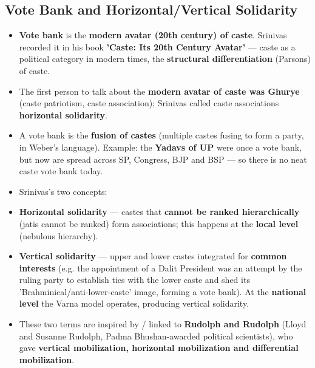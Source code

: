 \subsection{Vote Bank and Horizontal/Vertical Solidarity}

\begin{KeyConcept}
\begin{itemize}
\item \textbf{Vote bank} is the \textbf{modern avatar (20th century) of caste}. Srinivas recorded it in his book \textbf{'Caste: Its 20th Century Avatar'} --- caste as a political category in modern times, the \textbf{structural differentiation} (Parsons) of caste.
\item The first person to talk about the \textbf{modern avatar of caste was Ghurye} (caste patriotism, caste association); Srinivas called caste associations \textbf{horizontal solidarity}.
\item A vote bank is the \textbf{fusion of castes} (multiple castes fusing to form a party, in Weber's language). Example: the \textbf{Yadavs of UP} were once a vote bank, but now are spread across SP, Congress, BJP and BSP --- so there is no neat caste vote bank today.
\end{itemize}
\end{KeyConcept}

\begin{KeyConcept}
\begin{itemize}
\item Srinivas's two concepts:
\item \textbf{Horizontal solidarity} --- castes that \textbf{cannot be ranked hierarchically} (jatis cannot be ranked) form associations; this happens at the \textbf{local level} (nebulous hierarchy).
\item \textbf{Vertical solidarity} --- upper and lower castes integrated for \textbf{common interests} (e.g. the appointment of a Dalit President was an attempt by the ruling party to establish ties with the lower caste and shed its 'Brahminical/anti-lower-caste' image, forming a vote bank). At the \textbf{national level} the Varna model operates, producing vertical solidarity.
\item These two terms are inspired by / linked to \textbf{Rudolph and Rudolph} (Lloyd and Susanne Rudolph, Padma Bhushan-awarded political scientists), who gave \textbf{vertical mobilization, horizontal mobilization and differential mobilization}.
\end{itemize}
\end{KeyConcept}


